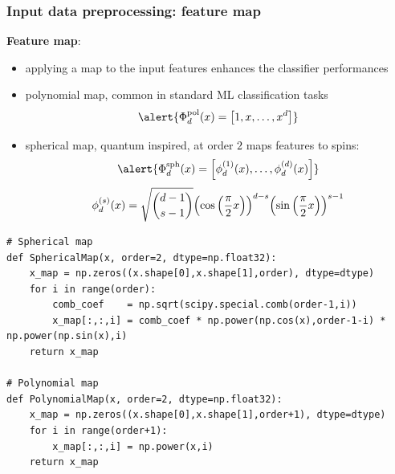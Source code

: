 \documentclass[xcolor=table,8pt]{beamer}
\begin{document}
    
    \begin{frame}[t,fragile]
        \frametitle{Input data preprocessing: feature map}

        \textbf{Feature map}:
        \begin{itemize}
            \item applying a map to the input features enhances the classifier performances
            \item \alert{polynomial map}, common in standard ML classification tasks
                {\normalsize
                \begin{equation}
                    \alert{
                        \Phi^{\text{pol}}_{d}(x) =  \qty[1, x, \dots ,  x^{d}]
                    }
                \end{equation}
                }
            \item \alert{spherical map}, quantum inspired, at order \( 2 \) maps features to spins:
                {\normalsize
                    \begin{equation}
                        \alert{
                            \Phi^{\text{sph}}_{d}(x)=  \qty[\phi^{(1)}_{d}(x), \dots, \phi^{(d)}_{d}(x)]
                        }
                    \end{equation}
                    \begin{equation*}
                        \phi_{d}^{(s)}(x)    =    \sqrt{{{d-1} \choose {s-1}}}
                        \qty( \cos\qty(\frac{\pi}{2} x) )^{d-s}    \qty( \sin\qty(\frac{\pi}{2} x) )^{s-1}
                    \end{equation*}
                }
        \end{itemize}

        \begin{lstlisting}[style=mypython, numbers=none, frame=single, aboveskip=5pt, belowskip=10pt, backgroundcolor=\color{white},rulecolor=\color{beamer@blendedblue},framerule=0.1pt]
# Spherical map
def SphericalMap(x, order=2, dtype=np.float32):
    x_map = np.zeros((x.shape[0],x.shape[1],order), dtype=dtype)
    for i in range(order):
        comb_coef    = np.sqrt(scipy.special.comb(order-1,i))
        x_map[:,:,i] = comb_coef * np.power(np.cos(x),order-1-i) * np.power(np.sin(x),i)
    return x_map

# Polynomial map
def PolynomialMap(x, order=2, dtype=np.float32):
    x_map = np.zeros((x.shape[0],x.shape[1],order+1), dtype=dtype)
    for i in range(order+1):
        x_map[:,:,i] = np.power(x,i)
    return x_map
        \end{lstlisting}
    \end{frame}
    
\end{document}
